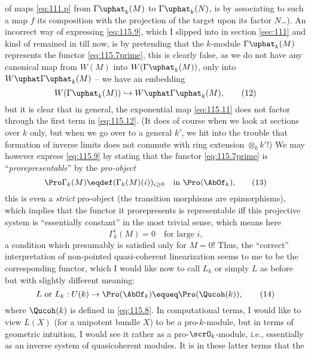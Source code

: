 of maps \eqref{eq:111.p} from $\Gamma\uphat_k(M)$ to
$\Gamma\uphat_k(N)$, is by associating to such a map $f$ its
composition with the projection of the target upon its factor
$N$\dots). An incorrect way of expressing \eqref{eq:115.9}, which I
slipped into in section \ref{sec:111} and kind of remained in till
now, is by pretending that the $k$-module $\Gamma\uphat_k(M)$
represents the functor \eqref{eq:115.7prime}, this is
clearly false, as we do not have any canonical map from $W(M)$ into
$W(\Gamma\uphat_k(M))$, only into $W\uphat\Gamma\uphat_k(M)$ -- we
have an embedding
\begin{equation}
  \label{eq:115.12}
  W(\Gamma\uphat_k(M))\hookrightarrow W\uphat\Gamma\uphat_k(M),\tag{12}
\end{equation}
but it is clear that in general, the exponential map \eqref{eq:115.11}
does not factor through the first term in \eqref{eq:115.12}. (It does
of course when we look at sections over $k$ only, but when we go over
to a general $k'$, we hit into the trouble that formation of inverse
limits does not commute with ring extension $\otimes_k k'$!) We may
however express \eqref{eq:115.9} by stating that the functor
\eqref{eq:115.7prime} is ``\emph{prorepresentable}'' by the
\emph{pro-object}
\begin{equation}
  \label{eq:115.13}
  \Pro \Gamma_k(M) \eqdef (\Gamma_k(M)(i))_{i\ge0} \quad
  \text{in $\Pro(\AbOf_k)$,}\tag{13}
\end{equation}
this is even a \emph{strict} pro-object (the transition morphisms are
epimorphisms), which implies that the functor it prorepresents is
representable if{f} this projective system is ``essentially constant''
in the most trivial sense, which means here
\[\Gamma^i_k(M)=0\quad\text{for large $i$,}\]
a condition which presumably is satisfied only for $M=0$! Thus, the
``correct'' interpretation of non-pointed quasi-coherent linearization
seems to me to be the corresponding functor, which I would like now to
call $L_k$ or simply $L$ as before but with slightly different
meaning:
\begin{equation}
  \label{eq:115.14}
  L\text{ or }L_k : U(k)\to \Pro(\AbOf_k) \equeq \Pro(\Qucoh(k)),\tag{14}
\end{equation}
where $\Qucoh(k)$ is defined in \eqref{eq:115.8}. In computational
terms, I would like to view $L(X)$ (for a unipotent bundle $X$) to be
a pro-$k$-module, but in terms of geometric intuition, I would see it
rather as a pro-$\scrO_k$-module, i.e., essentially as an inverse
system of quasicoherent modules. It is in these latter terms that the
